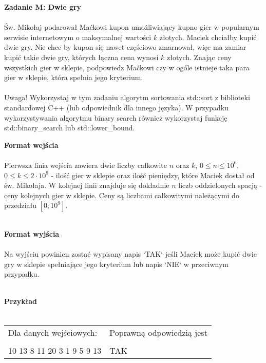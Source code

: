 \documentclass[
  fontsize=12pt  %
 ,english        %
 ,headinclude    %
 ,headsepline    %
]{scrbook}       %
\begin{document}
\vspace{50 mm}
\hspace{50 mm}
\newline

\par{\Large \textbf{Zadanie M: Dwie gry}} \\ \\
Św. Mikołaj podarował Maćkowi kupon umożliwiający kupno gier w popularnym serwisie internetowym o maksymalnej wartości $k$ złotych. Maciek chciałby kupić dwie gry. Nie chce by kupon się nawet częściowo zmarnował, więc ma zamiar kupić takie dwie gry, których łączna cena wynosi $k$ złotych. Znając ceny wszystkich gier w sklepie, podpowiedz Maćkowi czy w ogóle istnieje taka para gier w sklepie, która spełnia jego kryterium. 
\\ \\
Uwaga! Wykorzystaj w tym zadaniu algorytm sortowania std::sort z biblioteki standardowej C++ (lub odpowiednik dla innego języka). W przypadku wykorzystywania algorytmu binary search również wykorzystaj funkcję std::binary\_search lub std::lower\_bound.
\\
\par{\Large \textbf{Format wejścia}} \\ \\
Pierwsza linia wejścia zawiera dwie liczby całkowite $n$ oraz $k$, $0 \leq n \leq 10^6$, $0 \leq k \leq 2 \cdot 10^9$ - ilość gier w sklepie oraz ilość pieniędzy, które Maciek dostał od św. Mikołaja. W kolejnej linii znajduje się dokładnie $n$ liczb oddzielonych spacją - ceny kolejnych gier w sklepie. Ceny są liczbami całkowitymi należącymi do przedziału $[0; 10^9]$.
\\ \\
\par{\Large \textbf{Format wyjścia}} \\ \\
Na wyjściu powinien zostać wypisany napis `TAK` jeśli Maciek może kupić dwie gry w sklepie spełniające jego kryterium lub napis `NIE` w przeciwnym przypadku.
\\ \\
\par{\Large \textbf{Przykład}} \\ \\
\begin{tabular}{ p{7cm} p{7cm} }

  Dla danych wejściowych: \hspace{40mm}& Poprawną odpowiedzią jest \\
& \\

10 13 \newline
9 8 11 20 3 1 9 5 9 13 \newline

&   
TAK
\\

\end{tabular}
\end{document}
